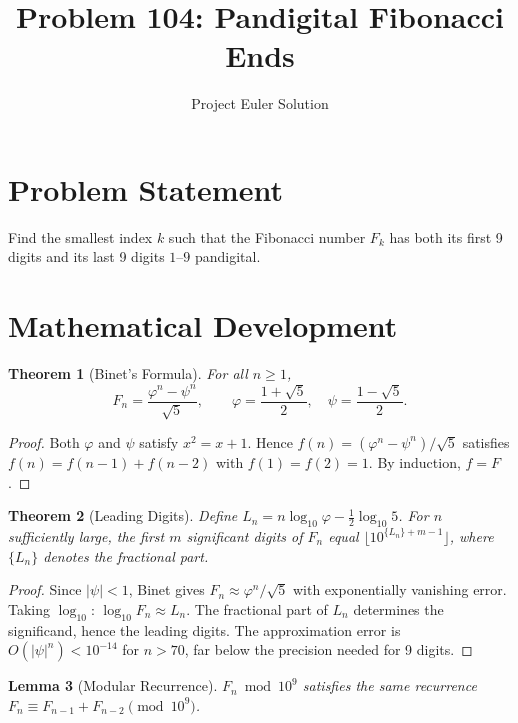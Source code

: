 \documentclass[12pt]{article}
\title{Problem 104: Pandigital Fibonacci Ends}
\author{Project Euler Solution}
\date{}
\newtheorem{theorem}{Theorem}
\newtheorem{lemma}[theorem]{Lemma}
\begin{document}
\maketitle

\section{Problem Statement}

Find the smallest index $k$ such that the Fibonacci number $F_k$ has both its first 9 digits and its last 9 digits $1$--$9$ pandigital.

\section{Mathematical Development}

\begin{theorem}[Binet's Formula]
For all $n \geq 1$,
\[
F_n = \frac{\varphi^n - \psi^n}{\sqrt{5}}, \qquad \varphi = \frac{1+\sqrt{5}}{2}, \quad \psi = \frac{1-\sqrt{5}}{2}.
\]
\end{theorem}

\begin{proof}
Both $\varphi$ and $\psi$ satisfy $x^2 = x + 1$. Hence $f(n) = (\varphi^n - \psi^n)/\sqrt{5}$ satisfies $f(n) = f(n-1) + f(n-2)$ with $f(1) = f(2) = 1$. By induction, $f = F$.
\end{proof}

\begin{theorem}[Leading Digits]
\label{thm:leading}
Define $L_n = n\log_{10}\varphi - \tfrac{1}{2}\log_{10}5$. For $n$ sufficiently large, the first $m$ significant digits of $F_n$ equal $\lfloor 10^{\{L_n\}+m-1}\rfloor$, where $\{L_n\}$ denotes the fractional part.
\end{theorem}

\begin{proof}
Since $|\psi| < 1$, Binet gives $F_n \approx \varphi^n/\sqrt{5}$ with exponentially vanishing error. Taking $\log_{10}$: $\log_{10} F_n \approx L_n$. The fractional part of $L_n$ determines the significand, hence the leading digits. The approximation error is $O(|\psi|^n) < 10^{-14}$ for $n > 70$, far below the precision needed for 9 digits.
\end{proof}

\begin{lemma}[Modular Recurrence]
$F_n \bmod 10^9$ satisfies the same recurrence $F_n \equiv F_{n-1} + F_{n-2} \pmod{10^9}$.
\end{lemma}
\end{document}
